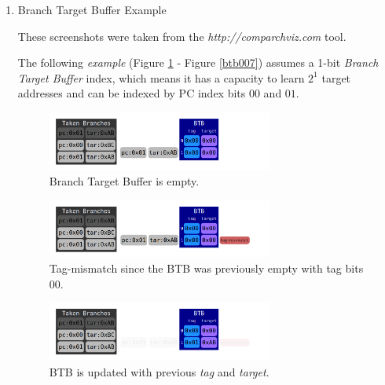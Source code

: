 \documentclass[12pt]{article}
\newenvironment{QandA}{\begin{enumerate}[label=\bfseries\arabic*.]\bfseries}
                      {\end{enumerate}}
\newenvironment{answered}{\par\quad\normalfont}{}
\begin{document}
\begin{QandA}
\begin{answered}
The \textit{Branch Target Buffer (BTB)} does exist on the critical path and therefore adds a bit of extra overhead to the overall system. 

With \textit{static targets}, the BTB mechanism will perform well.
\end{answered}

\ 

\item Branch Target Buffer Example
\begin{answered}
These screenshots were taken from the \textit{http://comparchviz.com} tool.

The following \textit{example} (Figure \ref{btb001} - Figure \ref{btb007}) assumes a 1-bit \textit{Branch Target Buffer} index, which means it has a capacity to learn $2^{1}$ target addresses and can be indexed by PC index bits $00$ and $01$.

\begin{figure}[!ht]
\centering
\includegraphics[width=0.7\textwidth]{chapter7_imgs/btb/btb000.png}
\caption{Branch Target Buffer is empty.}
\label{btb001}
\end{figure}

\begin{figure}[!ht]
\centering
\includegraphics[width=0.7\textwidth]{chapter7_imgs/btb/btb001.png}
\caption{Tag-mismatch since the BTB was previously empty with tag bits $00$.}
\label{btb002}
\end{figure}

\begin{figure}[!ht]
\centering
\includegraphics[width=0.7\textwidth]{chapter7_imgs/btb/btb002.png}
\caption{BTB is updated with previous \textit{tag} and \textit{target}.}
\label{btb003}
\end{figure}


\end{answered}
\end{QandA}
\end{document}
